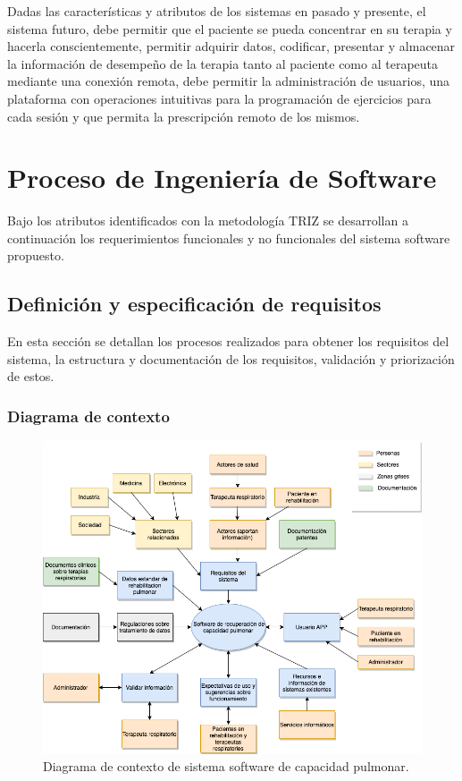 \documentclass[12pt]{article}
\begin{document}
Dadas las características y atributos de los sistemas en pasado y presente, el sistema futuro, debe permitir que el paciente se pueda concentrar en su terapia y hacerla conscientemente, permitir adquirir datos, codificar, presentar y almacenar la información de desempeño de la terapia tanto al paciente como al terapeuta mediante una conexión remota, debe permitir la administración de usuarios, una plataforma con operaciones intuitivas para la programación de ejercicios para cada sesión y que permita la prescripción remoto de los mismos.

\section{Proceso de Ingeniería de Software}



Bajo los atributos identificados con la metodología TRIZ se desarrollan a continuación los requerimientos funcionales y no funcionales del sistema software propuesto.


\subsection{Definición y especificación de requisitos}

En esta sección se detallan los procesos realizados para obtener los requisitos del sistema, la estructura y documentación de los requisitos, validación y priorización de estos.

\subsubsection{Diagrama de contexto}


\begin{figure}[ht]
\centering
\includegraphics[scale=0.45]{imag/C4-Diagram contexto.png}
\caption{Diagrama de contexto de sistema software de capacidad pulmonar. }
\label{4}
\end{figure}
\FloatBarrier
\end{document}
